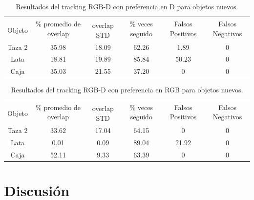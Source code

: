 \begin{table}
    \begin{tabular}{|c|c|c|c|c|c|}
    \hline
    & \multirow{2}{2.4cm}{\% promedio de overlap} & & \multirow{2}{2cm}{\% veces seguido} & \multirow{2}{1.6cm}{Falsos Positivos} & \multirow{2}{1.6cm}{Falsos Negativos}\\
	Objeto & & overlap STD & & &\\
    \hline
    Taza 2  & 35.98      & 18.09       & 62.26             & 1.89             & 0\\
    \hline
    Lata    & 18.81      & 19.89       & 85.84             & 50.23            & 0\\
    \hline
    Caja    & 35.03      & 21.55       & 37.20             & 0                & 0\\
    \hline
    \end{tabular}
\caption{Resultados del tracking RGB-D con preferencia en D para objetos nuevos.}
\label{tabla_rgbd_d_nuevos}
\end{table}

\begin{table}
    \begin{tabular}{|c|c|c|c|c|c|}
    \hline
    & \multirow{2}{2.4cm}{\% promedio de overlap} & & \multirow{2}{2cm}{\% veces seguido} & \multirow{2}{1.6cm}{Falsos Positivos} & \multirow{2}{1.6cm}{Falsos Negativos}\\
	Objeto & & overlap STD & & &\\
    \hline
    Taza 2  & 33.62      & 17.04       & 64.15             & 0                & 0\\
    \hline
    Lata    &  0.01      &  0.09       & 89.04             & 21.92            & 0\\
    \hline
    Caja    & 52.11      &  9.33       & 63.39             & 0                & 0\\
    \hline
    \end{tabular}
\caption{Resultados del tracking RGB-D con preferencia en RGB para objetos nuevos.}
\label{tabla_rgbd_rgb_nuevos}
\end{table}




\section{Discusión}